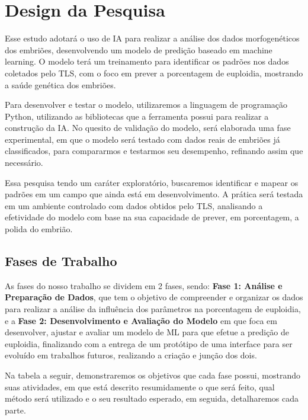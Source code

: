 \section{Design da Pesquisa}

Esse estudo adotará o uso de IA para realizar a análise dos dados morfogenéticos dos embriões, desenvolvendo um modelo de predição baseado em machine learning. O modelo terá um treinamento para identificar os padrões nos dados coletados pelo TLS, com o foco em prever a porcentagem de euploidia, mostrando a saúde genética dos embriões.

Para desenvolver e testar o modelo, utilizaremos a linguagem de programação Python, utilizando as bibliotecas que a ferramenta possui para realizar a construção da IA. No quesito de validação do modelo, será elaborada uma fase experimental, em que o modelo será testado com dados reais de embriões já classificados, para compararmos e testarmos seu desempenho, refinando assim que necessário.

Essa pesquisa tendo um caráter exploratório, buscaremos identificar e mapear os padrões em um campo que ainda está em desenvolvimento. A prática será testada em um ambiente controlado com dados obtidos pelo TLS, analisando a efetividade do modelo com base na sua capacidade de prever, em porcentagem, a polida do embrião.

\subsection{Fases de Trabalho}

As fases do nosso trabalho se dividem em 2 fases, sendo: \textbf{Fase 1: Análise e Preparação de Dados}, que tem o objetivo de compreender e organizar os dados para realizar a análise da influência dos parâmetros na porcentagem de euploidia, e a \textbf{Fase 2: Desenvolvimento e Avaliação do Modelo} em que foca em desenvolver, ajustar e avaliar um modelo de ML para que efetue a predição de euploidia, finalizando com a entrega de um protótipo de uma interface para ser evoluído em trabalhos futuros, realizando a criação e junção dos dois.

Na tabela a seguir, demonstraremos os objetivos que cada fase possui, mostrando suas atividades, em que está descrito resumidamente o que será feito, qual método será utilizado e o seu resultado esperado, em seguida, detalharemos cada parte. 



%     

